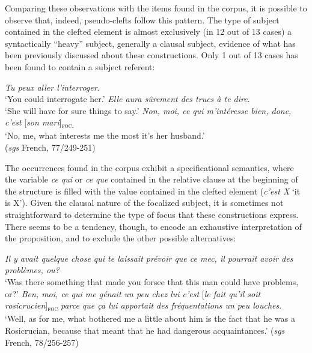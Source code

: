 Comparing these observations with the items found in the corpus, it is possible to observe that, indeed, pseudo-clefts follow this pattern. The type of subject contained in the clefted element is almost exclusively (in 12 out of 13 cases) a syntactically ``heavy” subject, generally a clausal subject, evidence of what has been previously discussed about these constructions. Only 1 out of 13 cases has been found to contain a subject referent:

\ea \label{ex:5:13}
\ea \textit{Tu peux aller l'interroger}.\\
`You could interrogate her.'
 \textit{Elle aura sûrement des trucs à te dire}.\\
`She will have for sure things to say.'
\ex \textit{Non, moi, ce qui m'intéresse bien, donc, c'est} {[\textit{son mari}]\textsubscript{\textsc{foc.}}}\normalsize\\
`No, me, what interests me the most it's her husband.' \\
\hfill (\textit{sgs} French, 77/249-251)   
\z \z


The occurrences found in the corpus exhibit a specificational semantics, where the variable \textit{ce qui} or \textit{ce que} contained in the relative clause at the beginning of the structure is filled with the value contained in the clefted element (\textit{c'est X} `it is X'). Given the clausal nature of the focalized subject, it is sometimes not straightforward to determine the type of focus that these constructions express. There seems to be a tendency, though, to encode an exhaustive interpretation of the proposition, and to exclude the other possible alternatives:

 \ea  \label{ex:5:14}
\ea \textit{Il y avait quelque chose qui te laissait prévoir que ce mec, il pourrait avoir des problèmes, ou?} \\
 `Was there something that made you forsee that this man could have problems, or?'
\ex \textit{Ben, moi, ce qui me génait un peu chez lui c'est} {[\textit{le fait qu'il soit rosicrucien}]\textsubscript{\textsc{foc}}} \normalsize \textit{parce que ça lui apportait des fréquentations un peu louches}.\\
‘Well, as for me, what bothered me a little about him is the fact that he was a Rosicrucian, because that meant that he had dangerous acquaintances.' \hfill (\textit{sgs} French, 78/256-257)   
\z \z 


